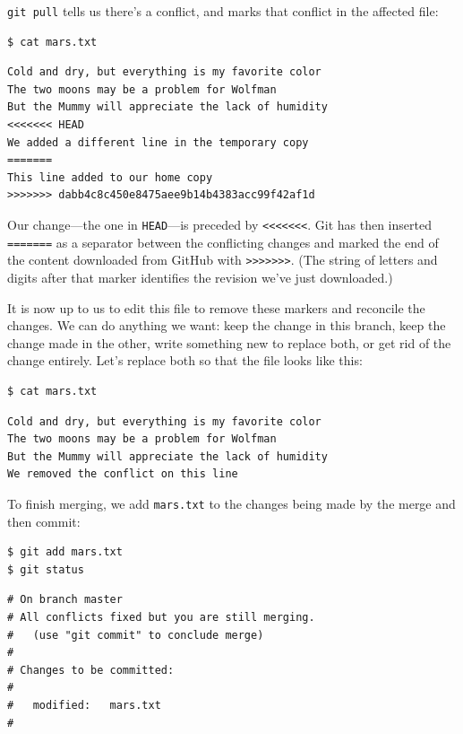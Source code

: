 \documentclass{book}
\begin{document}
\texttt{git pull} tells us there's a conflict, and marks that conflict
in the affected file:

\begin{verbatim}
$ cat mars.txt
\end{verbatim}

\begin{verbatim}
Cold and dry, but everything is my favorite color
The two moons may be a problem for Wolfman
But the Mummy will appreciate the lack of humidity
<<<<<<< HEAD
We added a different line in the temporary copy
=======
This line added to our home copy
>>>>>>> dabb4c8c450e8475aee9b14b4383acc99f42af1d
\end{verbatim}

Our change---the one in \texttt{HEAD}---is preceded by
\texttt{\textless{}\textless{}\textless{}\textless{}\textless{}\textless{}\textless{}}.
Git has then inserted \texttt{=======} as a separator between the
conflicting changes and marked the end of the content downloaded from
GitHub with
\texttt{\textgreater{}\textgreater{}\textgreater{}\textgreater{}\textgreater{}\textgreater{}\textgreater{}}.
(The string of letters and digits after that marker identifies the
revision we've just downloaded.)

It is now up to us to edit this file to remove these markers and
reconcile the changes. We can do anything we want: keep the change in
this branch, keep the change made in the other, write something new to
replace both, or get rid of the change entirely. Let's replace both so
that the file looks like this:

\begin{verbatim}
$ cat mars.txt
\end{verbatim}

\begin{verbatim}
Cold and dry, but everything is my favorite color
The two moons may be a problem for Wolfman
But the Mummy will appreciate the lack of humidity
We removed the conflict on this line
\end{verbatim}

To finish merging, we add \texttt{mars.txt} to the changes being made by
the merge and then commit:

\begin{verbatim}
$ git add mars.txt
$ git status
\end{verbatim}

\begin{verbatim}
# On branch master
# All conflicts fixed but you are still merging.
#   (use "git commit" to conclude merge)
#
# Changes to be committed:
#
#   modified:   mars.txt
#
\end{verbatim}
\end{document}
